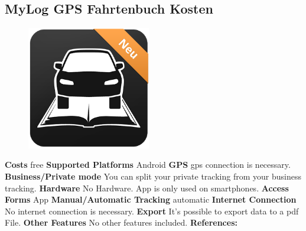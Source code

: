 \begin{singlespace}
\section{MyLog GPS Fahrtenbuch Kosten}
\begin{figure}
  \begin{center}
    \includegraphics[width=0.48\textwidth]{bilder/mylog}
  \end{center}
\end{figure}
\textbf{Costs} free
\newline\newline
\textbf{Supported Platforms} Android
\newline\newline
\textbf{GPS} \gls{gps} connection is necessary.
\newline\newline
\textbf{Business/Private mode} You can split your private tracking from your business tracking.
\newline\newline
\textbf{Hardware} No Hardware. App is only used on smartphones.
\newline\newline
\textbf{Access Forms} App
\newline\newline
\textbf{Manual/Automatic Tracking} automatic
\newline\newline
\textbf{Internet Connection} No internet connection is necessary.
\newline\newline
\textbf{Export} It’s possible to export data to a \gls{pdf} File.
\newline\newline
\textbf{Other Features} No other features included.
\newline\newline
\textbf{References:} \cite{MyLog_GPS_Fahrtenbuch_Costs}
\newpage


\end{singlespace}
